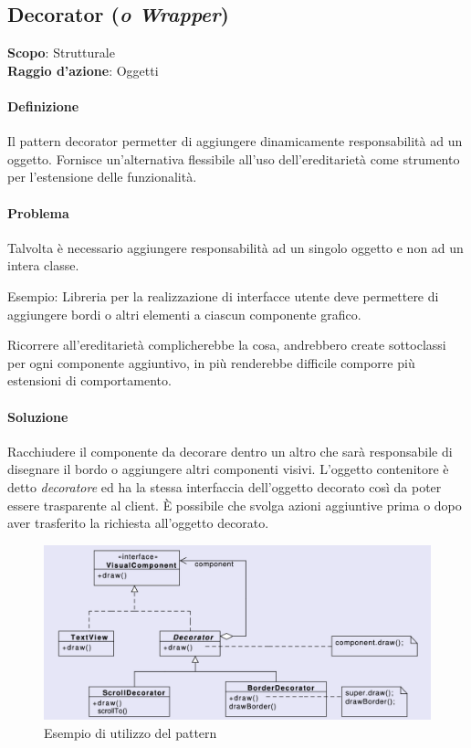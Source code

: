 \subsection{Decorator (\textit{o Wrapper})}
\label{decorator}

\textbf{Scopo}: Strutturale \\
\textbf{Raggio d'azione}: Oggetti

\paragraph{Definizione} Il pattern decorator permetter di aggiungere dinamicamente responsabilità ad un oggetto. Fornisce un'alternativa flessibile all'uso dell'ereditarietà come strumento per l'estensione delle funzionalità.

\paragraph{Problema} Talvolta è necessario aggiungere responsabilità ad un singolo oggetto e non ad un intera classe.

Esempio: Libreria per la realizzazione di interfacce utente deve permettere di aggiungere bordi o altri elementi a ciascun componente grafico.

Ricorrere all'ereditarietà complicherebbe la cosa, andrebbero create sottoclassi per ogni componente aggiuntivo, in più renderebbe difficile comporre più estensioni di comportamento.

\paragraph{Soluzione} Racchiudere il componente da decorare dentro un altro che sarà responsabile di disegnare il bordo o aggiungere altri componenti visivi. L'oggetto contenitore è detto \textit{decoratore} ed ha la stessa interfaccia dell'oggetto decorato così da poter essere trasparente al client. È possibile che svolga azioni aggiuntive prima o dopo aver trasferito la richiesta all'oggetto decorato.

\begin{figure}[H]
    \centering
    \includegraphics[width=1\linewidth]{assets/pattern/decorator/decorator-esempio.png}
    \caption{Esempio di utilizzo del pattern}
\end{figure}

